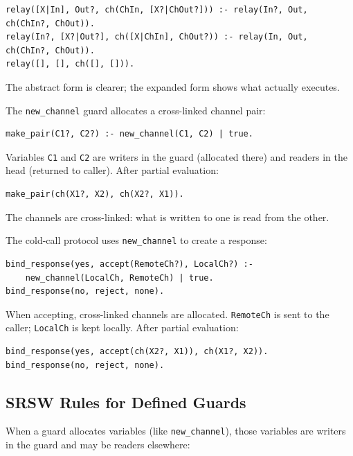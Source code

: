 \begin{verbatim}
relay([X|In], Out?, ch(ChIn, [X?|ChOut?])) :- relay(In?, Out, ch(ChIn?, ChOut)).
relay(In?, [X?|Out?], ch([X|ChIn], ChOut?)) :- relay(In, Out, ch(ChIn?, ChOut)).
relay([], [], ch([], [])).
\end{verbatim}

The abstract form is clearer; the expanded form shows what actually executes.

The \verb|new_channel| guard allocates a cross-linked channel pair:

\begin{verbatim}
make_pair(C1?, C2?) :- new_channel(C1, C2) | true.
\end{verbatim}

Variables \verb|C1| and \verb|C2| are writers in the guard (allocated there) and readers in the head (returned to caller). After partial evaluation:

\begin{verbatim}
make_pair(ch(X1?, X2), ch(X2?, X1)).
\end{verbatim}

The channels are cross-linked: what is written to one is read from the other.

The cold-call protocol uses \verb|new_channel| to create a response:

\begin{verbatim}
bind_response(yes, accept(RemoteCh?), LocalCh?) :-
    new_channel(LocalCh, RemoteCh) | true.
bind_response(no, reject, none).
\end{verbatim}

When accepting, cross-linked channels are allocated. \verb|RemoteCh| is sent to the caller; \verb|LocalCh| is kept locally. After partial evaluation:

\begin{verbatim}
bind_response(yes, accept(ch(X2?, X1)), ch(X1?, X2)).
bind_response(no, reject, none).
\end{verbatim}

\subsection{SRSW Rules for Defined Guards}
\label{sec:srsw-defined-guards}

When a guard allocates variables (like \verb|new_channel|), those variables are writers in the guard and may be readers elsewhere:

